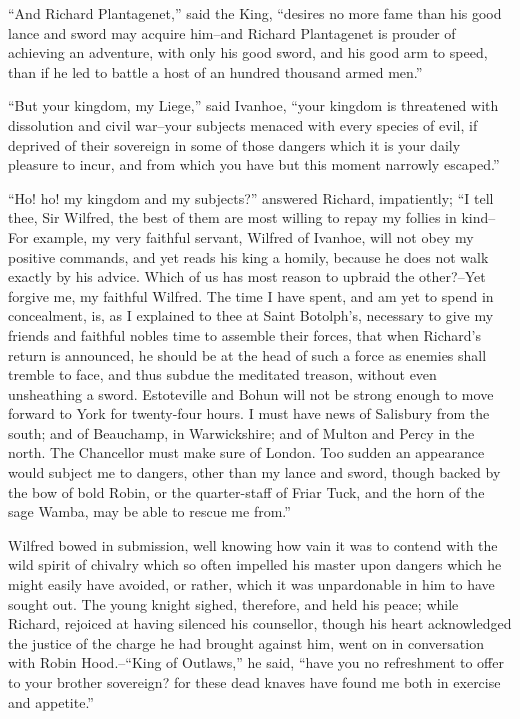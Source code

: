 ``And Richard Plantagenet,'' said the King, ``desires no more fame than
his good lance and sword may acquire him--and Richard Plantagenet is
prouder of achieving an adventure, with only his good sword, and his
good arm to speed, than if he led to battle a host of an hundred
thousand armed men.''

``But your kingdom, my Liege,'' said Ivanhoe, ``your kingdom is
threatened with dissolution and civil war--your subjects menaced with
every species of evil, if deprived of their sovereign in some of those
dangers which it is your daily pleasure to incur, and from which you
have but this moment narrowly escaped.''

``Ho! ho! my kingdom and my subjects?'' answered Richard, impatiently;
``I tell thee, Sir Wilfred, the best of them are most willing to repay
my follies in kind--For example, my very faithful servant, Wilfred of
Ivanhoe, will not obey my positive commands, and yet reads his king a
homily, because he does not walk exactly by his advice. Which of us has
most reason to upbraid the other?--Yet forgive me, my faithful Wilfred.
The time I have spent, and am yet to spend in concealment, is, as I
explained to thee at Saint Botolph's, necessary to give my friends and
faithful nobles time to assemble their forces, that when Richard's
return is announced, he should be at the head of such a force as enemies
shall tremble to face, and thus subdue the meditated treason, without
even unsheathing a sword. Estoteville and Bohun will not be strong
enough to move forward to York for twenty-four hours. I must have news
of Salisbury from the south; and of Beauchamp, in Warwickshire; and of
Multon and Percy in the north. The Chancellor must make sure of London.
Too sudden an appearance would subject me to dangers, other than my
lance and sword, though backed by the bow of bold Robin, or the
quarter-staff of Friar Tuck, and the horn of the sage Wamba, may be able
to rescue me from.''

Wilfred bowed in submission, well knowing how vain it was to contend
with the wild spirit of chivalry which so often impelled his master upon
dangers which he might easily have avoided, or rather, which it was
unpardonable in him to have sought out. The young knight sighed,
therefore, and held his peace; while Richard, rejoiced at having
silenced his counsellor, though his heart acknowledged the justice of
the charge he had brought against him, went on in conversation with
Robin Hood.--``King of Outlaws,'' he said, ``have you no refreshment to
offer to your brother sovereign? for these dead knaves have found me
both in exercise and appetite.''

